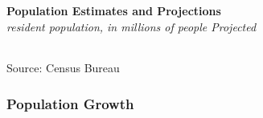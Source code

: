 \documentclass{report}
\begin{document}
{\begin{minipage}{0.76\textwidth}
\normalsize \textbf{Population Estimates and Projections}\\
\footnotesize{\textit{resident population, in millions of people \hspace{58mm} Projected}}\\
\noindent \hspace*{-2mm}  \setlength{\tabcolsep}{6.1pt} \color{black!90}
		{\renewcommand{\arraystretch}{1.6}
		 \begin{tabular}{p{31mm} R{7.5mm} R{7.5mm} R{7.5mm} R{7.5mm} R{7.5mm} R{7.5mm} | R{8.8mm}}
			  \hline
		\end{tabular}}\vspace{-2mm}
		
\footnotesize{Source: Census Bureau}
\end{minipage}
\newpage
\begin{minipage}{0.76\textwidth}
\subsubsection*{Population Growth}
\small 
\vspace{1mm}


\end{minipage}}
\end{document}
